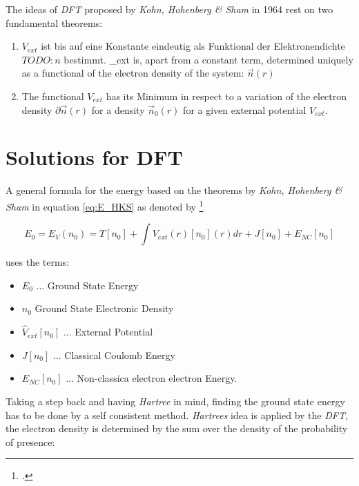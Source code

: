 The ideas of \textit{DFT} proposed by \textit{Kohn, Hohenberg & Sham} in 1964 rest on two fundamental theorems: 

\begin{enumerate}
\item $V_{ext} $ ist bis auf eine Konstante eindeutig als Funktional der Elektronendichte $TODO:n$ bestimmt. _{ext} is, apart from a constant term, determined uniquely as a functional of the electron density of the system: $\vec{n}(r)$

\item The functional $V_{ext} $ has its Minimum in respect to a variation of the electron density  $\partial \vec{n}(r)$  for a density $ \vec{n}_0(r)$ for a given external potential  $V_{ext} $. 
\end{enumerate}



\section{Solutions for DFT}
\label{subsection:2.2.3}

A general formula for the energy based on the theorems by \textit{Kohn, Hohenberg & Sham}  in equation  \ref{eq:E_HKS} as denoted by \footcite[6]{dft-hutter} 

\begin{equation}
	E_0 = E_V(n_0) = T[n_0] + \int V_{ext}(r)[n_0](r)dr + J[n_0] + E_{NC}[n_0]
	\label{eq:E_HKS}
\end{equation}


uses the terms: 

\begin{itemize}
	\item  $E_0$ ... Ground State Energy 
	\item  $n_0$ Ground State Electronic Density 
	\item  $\hat{V}_{ext}[n_0]$ ... External Potential 
	\item  $J[n_0] $ ... Classical Coulomb Energy
	\item  $E_{NC}[n_0]$ ... Non-classica electron electron Energy.
\end{itemize}

Taking a step back and having \textit{Hartree} in mind, finding the ground state energy has to be done by a self consistent method. \textit{Hartrees} idea is applied by the \textit{DFT}, the electron density is determined by the sum over the density of the probability of presence: 

